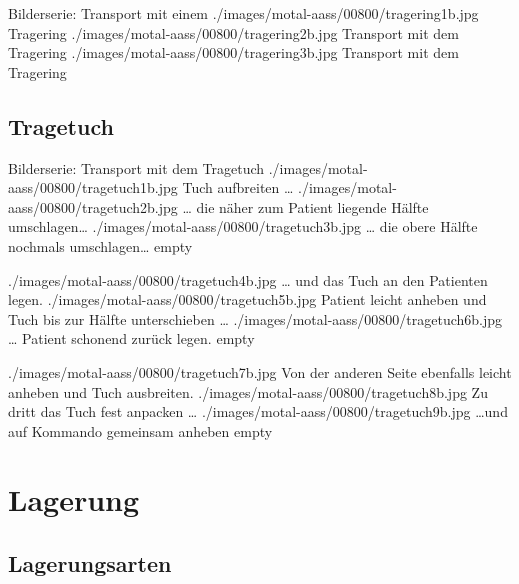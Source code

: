 \documentclass[
ngerman,
paper=a4,
asymmetric,
fontsize=8pt,
draft=false,
numbers=noenddot,
bibtotocnumbered,
footnotes=multiple,
toc=flat,
]{scrbook}
\begin{document}
\begin{PictureSeriesWide}{}{Bilderserie: Transport mit einem
 }
{./images/motal-aass/00800/tragering1b.jpg}
{Tragering}
{./images/motal-aass/00800/tragering2b.jpg}
{Transport mit dem Tragering}
{./images/motal-aass/00800/tragering3b.jpg}
{Transport mit dem Tragering}
{}
{}
\end{PictureSeriesWide}






\subsection{Tragetuch}

\label{topic:bergetuch}
\label{topic:tragetuch-taetigkeit}



\begin{PictureSeriesWide}{}{Bilderserie: Transport mit dem Tragetuch}
{./images/motal-aass/00800/tragetuch1b.jpg}%
{Tuch aufbreiten \ldots}
{./images/motal-aass/00800/tragetuch2b.jpg}%
{{\ldots} die näher zum Patient liegende Hälfte
umschlagen\ldots }
{./images/motal-aass/00800/tragetuch3b.jpg}%
{{\ldots} die obere Hälfte nochmals
umschlagen\ldots }
{empty}%
{}

{./images/motal-aass/00800/tragetuch4b.jpg}%
{{\ldots} und das Tuch an den Patienten legen.}
{./images/motal-aass/00800/tragetuch5b.jpg}%
{Patient leicht anheben und Tuch bis zur Hälfte
unterschieben \ldots}
{./images/motal-aass/00800/tragetuch6b.jpg}%
{{\ldots} Patient schonend zurück legen.}
{empty}%
{}

{./images/motal-aass/00800/tragetuch7b.jpg}%
{Von der anderen Seite ebenfalls leicht anheben und
Tuch ausbreiten. }
{./images/motal-aass/00800/tragetuch8b.jpg}%
{Zu dritt das Tuch fest anpacken \ldots }
{./images/motal-aass/00800/tragetuch9b.jpg}%
{\ldots und auf Kommando gemeinsam anheben}
{empty}%
{}
\end{PictureSeriesWide}


\clearpage %
\section{Lagerung}
\subsection{Lagerungsarten}
\label{topic:lagerungsarten}
\end{document}
